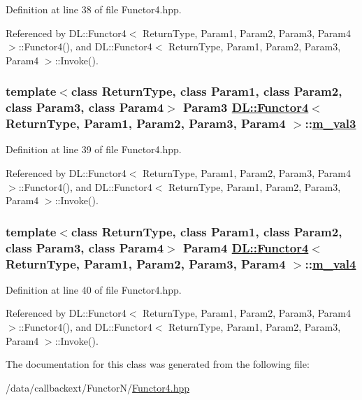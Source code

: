 Definition at line 38 of file Functor4.hpp.

Referenced by DL::Functor4$<$ Return\-Type, Param1, Param2, Param3, Param4 $>$::Functor4(), and DL::Functor4$<$ Return\-Type, Param1, Param2, Param3, Param4 $>$::Invoke().\hypertarget{classDL_1_1Functor4_r3}{
\subsubsection[m\_\-val3]{\setlength{\rightskip}{0pt plus 5cm}template$<$class Return\-Type, class Param1, class Param2, class Param3, class Param4$>$ Param3 \hyperlink{classDL_1_1Functor4}{DL::Functor4}$<$ Return\-Type, Param1, Param2, Param3, Param4 $>$::\hyperlink{classDL_1_1Functor4_r3}{m\_\-val3}}}
\label{classDL_1_1Functor4_r3}




Definition at line 39 of file Functor4.hpp.

Referenced by DL::Functor4$<$ Return\-Type, Param1, Param2, Param3, Param4 $>$::Functor4(), and DL::Functor4$<$ Return\-Type, Param1, Param2, Param3, Param4 $>$::Invoke().\hypertarget{classDL_1_1Functor4_r4}{
\subsubsection[m\_\-val4]{\setlength{\rightskip}{0pt plus 5cm}template$<$class Return\-Type, class Param1, class Param2, class Param3, class Param4$>$ Param4 \hyperlink{classDL_1_1Functor4}{DL::Functor4}$<$ Return\-Type, Param1, Param2, Param3, Param4 $>$::\hyperlink{classDL_1_1Functor4_r4}{m\_\-val4}}}
\label{classDL_1_1Functor4_r4}




Definition at line 40 of file Functor4.hpp.

Referenced by DL::Functor4$<$ Return\-Type, Param1, Param2, Param3, Param4 $>$::Functor4(), and DL::Functor4$<$ Return\-Type, Param1, Param2, Param3, Param4 $>$::Invoke().

The documentation for this class was generated from the following file:\begin{CompactItemize}
\item 
/data/callbackext/Functor\-N/\hyperlink{Functor4_8hpp}{Functor4.hpp}\end{CompactItemize}
